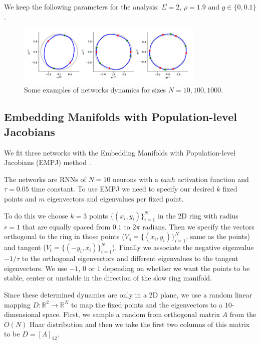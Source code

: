 \documentclass{article} %
\newcounter{ct}
\newcommand{\reals}{\mathbb{R}}
\theoremstyle{definition}
\theoremstyle{remark}
\begin{document}
We keep the following parameters for the analysis:
\(\Sigma = 2\),
\(\rho = 1.9\) and
\(g\in\{0, 0.1\}\).


\begin{figure}[h]
\centering
\includegraphics[width=0.8\textwidth]{N100_si2_rho1.9_g0_fp4.8.12}
\caption{Some examples of networks dynamics for sizes \(N = 10, 100, 1000\).}\label{fig:low_rank_examples}
\end{figure}









\subsection{Embedding Manifolds with Population-level Jacobians}\label{sec:supp:empj}
We fit three networks with the Embedding Manifolds with Population-level Jacobians (EMPJ) method \citep{pollock2020}.

The networks are RNNs of \(N = 10\) neurons with a \(tanh\) activation function and \(\tau = 0.05\) time constant.
 To use EMPJ we need to specify our desired \(k\) fixed points and \(m\) eigenvectors and eigenvalues per fixed point.

To do this we choose \(k = 3\) points \(\{(x_{i}, y_{i})\}_{i = 1}^{N}\) in the 2D ring with radius \(r = 1\) that are equally spaced from \(0.1\) to \(2 \pi\) radians. Then we specify the vectors orthogonal to the ring in those points (\(V_{o} = \{(x_{i}, y_{i})\}_{i = 1}^{N}\), same as the points) and tangent (\(V_{t} = \{(-y_{i}, x_{i})\}_{i = 1}^{N}\)).
Finally we associate the negative eigenvalue \(-1/\tau\) to the orthogonal eigenvectors and different eigenvalues to the tangent eigenvectors. We use \(-1\), \(0\) or \(1\) depending on whether we want the points to be stable, center or unstable in the direction of the slow ring manifold.

Since these determined dynamics are only in a 2D plane, we use a random linear mapping \(D\colon\reals^{2}\rightarrow\reals^{N}\) to map the fixed points and the eigenvectors to a \(10\)-dimensional space. First, we sample a random from orthogonal matrix \(A\) from the \(O(N)\) Haar distribution and then we take the first two columns of this matrix to be \(D=[A]_{12}\).
\end{document}
